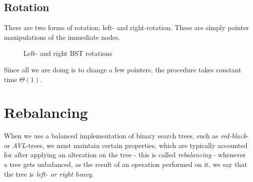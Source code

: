 \subsection{Rotation}
There are two forms of rotation; left- and right-rotation. These are simply
pointer manipulations of the immediate nodes.
\begin{figure}[H]
	\center
	\caption{Left- and right BST rotations}
	\label{fig:bst-rotations}
\end{figure}
Since all we are doing is to change a few pointers, the procedure takes
constant time $\Theta(1)$.

\section{Rebalancing}
When we use a balanced implementation of binary search trees, such as
\textit{red-black}- or \textit{AVL}-trees, we must maintain certain
properties, which are typically accounted for after applying an alteration on
the tree - this is called \textit{rebalancing} - whenever a tree gets
unbalanced, as the result of an operation performed on it, we say that the
tree is \textit{left- or right heavy}.

